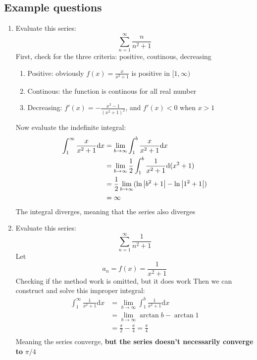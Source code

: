 \documentclass{article}
\numberwithin{equation}{section}
\begin{document}
\subsection{Example questions}
\begin{enumerate}
    \item Evaluate this series:
    \[
        \sum_{n = 1}^{\infty} \frac{n}{n^2 + 1} 
    \]
    First, check for the three criteria: positive, coutinous, decreasing
    \begin{enumerate}
        \item Positive: obviously $f(x) = \frac{x}{x^2 + 1}$ is positive in $[1 , \infty)$
        \item Continous: the function is continous for all real number
        \item Decreasing: $f'(x) = -\frac{x^2 - 1}{(x^2 + 1)^2}$, and $f'(x) < 0$ when $x > 1$
    \end{enumerate}
    Now evaluate the indefinite integral:
    \[
        \begin{split}
            \int_{1}^{\infty} \frac{x}{x^2 + 1} \mathrm{d}x &= \lim_{b\to \infty} \int_{1}^{b} \frac{x}{x^2 + 1} \mathrm{d}x\\
            & = \lim_{b\to \infty} \frac{1}{2}\int_{1}^{b} \frac{1}{x^2 + 1} \mathrm{d}(x^2 + 1)\\
            & = \frac{1}{2} \lim_{b\to \infty} (\ln \abs{b^2 + 1} - \ln \abs{1^2 + 1})\\
            & = \infty
        \end{split}
    \]
    The integral diverges, meaning that the series also diverges

    \item Evaluate this series:
    \[
        \sum_{n = 1}^{\infty} \frac{1}{n^2 + 1}
    \]
    Let 
    \[
        a_n = f(x) = \frac{1}{x^2 + 1}
    \]
    Checking if the method work is omitted, but it does work
    Then we can construct and solve this improper integral:
    \[
        \begin{split}
            \int_{1}^{\infty} \frac{1}{x^2 + 1} \mathrm{d}x & = \lim_{b\to \infty} \int_{1}^{b} \frac{1}{x^2 + 1}\mathrm{d}x\\
            & = \lim_{b\to \infty} \arctan b - \arctan 1\\
            & = \frac{\pi}{2} - \frac{\pi}{4} = \frac{\pi}{4}\\
        \end{split}
    \]
    Meaning the series converge, \textbf{but the series doesn't necessarily converge to} $\pi/4$
\end{enumerate}
\end{document}
